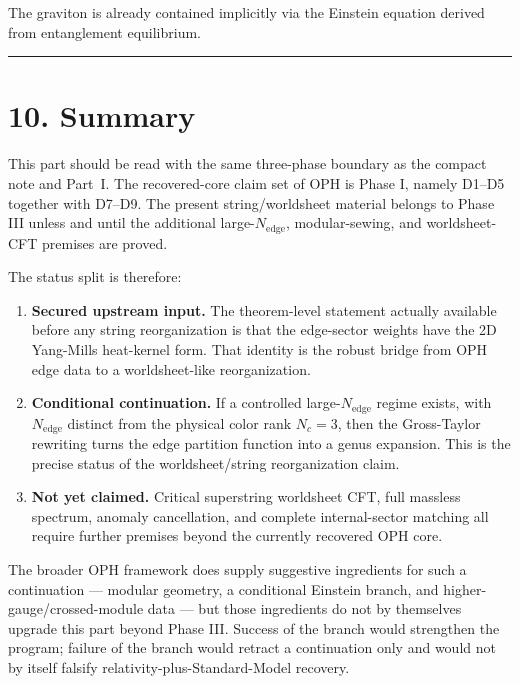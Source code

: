The graviton is already contained implicitly via the Einstein equation derived from entanglement equilibrium.

\begin{center}\rule{0.5\linewidth}{0.5pt}\end{center}

\section{10. Summary}\label{10-summary}

This part should be read with the same three-phase boundary as the compact note and Part~I. The recovered-core claim set of OPH is Phase I, namely D1--D5 together with D7--D9. The present string/worldsheet material belongs to Phase III unless and until the additional large-\(N_{\mathrm{edge}}\), modular-sewing, and worldsheet-CFT premises are proved.

The status split is therefore:

\begin{enumerate}
\def\labelenumi{\arabic{enumi}.}
\item
  \textbf{Secured upstream input.} The theorem-level statement actually available before any string reorganization is that the edge-sector weights have the 2D Yang-Mills heat-kernel form. That identity is the robust bridge from OPH edge data to a worldsheet-like reorganization.
\item
  \textbf{Conditional continuation.} If a controlled large-\(N_{\mathrm{edge}}\) regime exists, with \(N_{\mathrm{edge}}\) distinct from the physical color rank \(N_c=3\), then the Gross-Taylor rewriting turns the edge partition function into a genus expansion. This is the precise status of the worldsheet/string reorganization claim.
\item
  \textbf{Not yet claimed.} Critical superstring worldsheet CFT, full massless spectrum, anomaly cancellation, and complete internal-sector matching all require further premises beyond the currently recovered OPH core.
\end{enumerate}

The broader OPH framework does supply suggestive ingredients for such a continuation --- modular geometry, a conditional Einstein branch, and higher-gauge/crossed-module data --- but those ingredients do not by themselves upgrade this part beyond Phase III. Success of the branch would strengthen the program; failure of the branch would retract a continuation only and would not by itself falsify relativity-plus-Standard-Model recovery.

